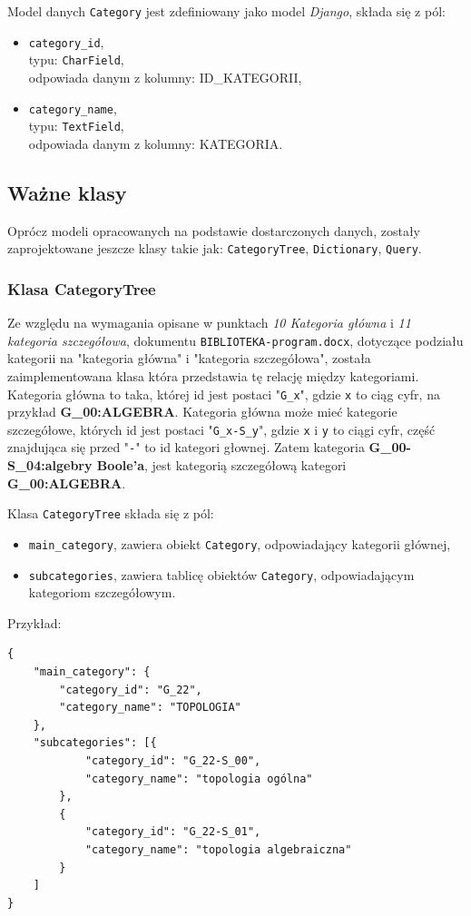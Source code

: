 \documentclass[twoside]{projektInzynierskiMS}
\begin{document}
Model danych \verb`Category` jest zdefiniowany jako model \textit{Django}, składa się z pól:

\begin{itemize}
	\item \verb`category_id`, \\
		typu: \verb`CharField`, \\
		odpowiada danym z kolumny: ID\_KATEGORII,
	\item \verb`category_name`, \\
	typu: \verb`TextField`, \\
	odpowiada danym z kolumny: KATEGORIA.
\end{itemize}

\subsection{Ważne klasy}

Oprócz modeli opracowanych na podstawie dostarczonych danych, zostały zaprojektowane jeszcze klasy takie jak: \verb`CategoryTree`, \verb`Dictionary`, \verb`Query`. 

\subsubsection{Klasa CategoryTree}

Ze względu na wymagania opisane w punktach \textit{10 Kategoria główna} i \textit{11 kategoria szczegółowa}, dokumentu \verb`BIBLIOTEKA-program.docx`, dotyczące podziału kategorii na "kategoria główna" i "kategoria szczegółowa", została zaimplementowana klasa która przedstawia tę relację między kategoriami. Kategoria główna to taka, której id jest postaci "\verb`G_x`", gdzie \verb`x` to ciąg cyfr, na przykład \textbf{G\_00:ALGEBRA}.
 Kategoria główna może mieć kategorie szczegółowe, których id jest postaci "\verb`G_x-S_y`", gdzie \verb`x` i \verb`y` to ciągi cyfr, część znajdująca się przed "\verb`-`" to id kategori głownej. Zatem kategoria \textbf{G\_00-S\_04:algebry Boole’a}, jest kategorią szczegółową kategori \textbf{G\_00:ALGEBRA}. 
 
Klasa \verb`CategoryTree` składa się z pól:
\begin{itemize}
	\item \verb`main_category`, 
		zawiera obiekt \verb`Category`,
		odpowiadający kategorii głównej,
	\item \verb`subcategories`, 
		zawiera tablicę obiektów \verb`Category`,
		odpowiadającym kategoriom szczegółowym.
\end{itemize}
Przykład:
\begin{verbatim}
{
    "main_category": {
        "category_id": "G_22",
        "category_name": "TOPOLOGIA"
    },
    "subcategories": [{
            "category_id": "G_22-S_00",
            "category_name": "topologia ogólna"
        },
        {
            "category_id": "G_22-S_01",
            "category_name": "topologia algebraiczna"
        }
    ]
}
\end{verbatim}
\end{document}
